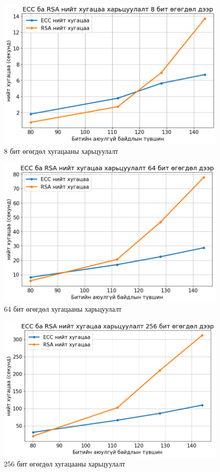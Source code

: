	\begin{figure}
		\centering
		\includegraphics[scale=0.65]{assets/graphs/7.png}
		\caption{8 бит өгөгдөл хугацааны харьцуулалт}
		\label{fig:architecture}
	\end{figure}
	\begin{figure}
		\centering
		\includegraphics[scale=0.65]{assets/graphs/8.png}
		\caption{64 бит өгөгдөл хугацааны харьцуулалт}
		\label{fig:architecture}
	\end{figure}
	\begin{figure}
		\centering
		\includegraphics[scale=0.65]{assets/graphs/9.png}
		\caption{256 бит өгөгдөл хугацааны харьцуулалт}
		\label{fig:architecture}
	\end{figure}
	
	

	